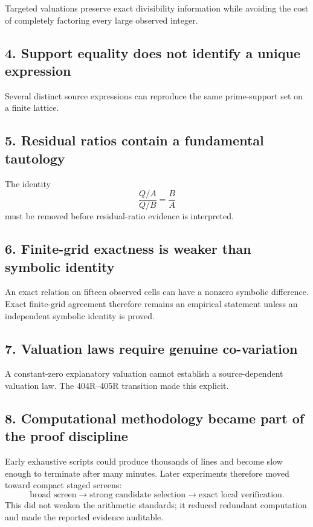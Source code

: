 \documentclass[11pt,a4paper]{article}
\begin{document}
Targeted valuations preserve exact divisibility information while avoiding the cost of completely factoring every large observed integer.

\subsection{4. Support equality does not identify a unique expression}

Several distinct source expressions can reproduce the same prime-support set on a finite lattice.

\subsection{5. Residual ratios contain a fundamental tautology}

The identity
\[
\frac{Q/A}{Q/B}=\frac BA
\]
must be removed before residual-ratio evidence is interpreted.

\subsection{6. Finite-grid exactness is weaker than symbolic identity}

An exact relation on fifteen observed cells can have a nonzero symbolic difference. Exact finite-grid agreement therefore remains an empirical statement unless an independent symbolic identity is proved.

\subsection{7. Valuation laws require genuine co-variation}

A constant-zero explanatory valuation cannot establish a source-dependent valuation law. The 404R--405R transition made this explicit.

\subsection{8. Computational methodology became part of the proof discipline}

Early exhaustive scripts could produce thousands of lines and become slow enough to terminate after many minutes. Later experiments therefore moved toward compact staged screens:
\[
\text{broad screen}
\rightarrow
\text{strong candidate selection}
\rightarrow
\text{exact local verification}.
\]
This did not weaken the arithmetic standards; it reduced redundant computation and made the reported evidence auditable.
\end{document}

